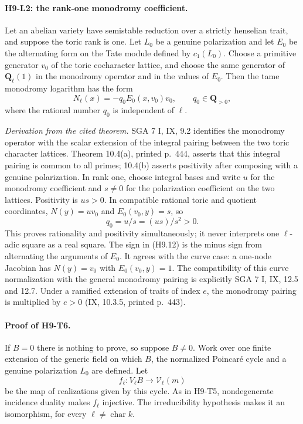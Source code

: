 \documentclass[11pt,a4paper]{article}
\begin{document}
\paragraph{H9-L2: the rank-one monodromy coefficient.}
Let an abelian variety have semistable reduction over a strictly
henselian trait, and suppose the toric rank is one. Let $L_0$ be a
genuine polarization and let $E_0$ be the alternating form on the Tate
module defined by $c_1(L_0)$. Choose a primitive generator $v_0$ of the
toric cocharacter lattice, and choose the same generator of
$\mathbf Q_\ell(1)$ in the monodromy operator and in the values of $E_0$.
Then the tame monodromy logarithm has the form
\[
 N_\ell(x)=-q_0 E_0(x,v_0)v_0,\qquad q_0\in\mathbf Q_{>0},
                                                        \tag{H9.12}
\]
where the rational number $q_0$ is independent of $\ell$.

\emph{Derivation from the cited theorem.} SGA 7 I, IX, 9.2 identifies
the monodromy operator with the scalar extension of the integral
pairing between the two toric character lattices. Theorem 10.4(a),
printed p.~444, asserts that this integral pairing is common to all
primes; 10.4(b) asserts positivity after composing with a genuine
polarization. In rank one, choose integral bases and write $u$ for
the monodromy coefficient and $s\ne0$ for the polarization coefficient
on the two lattices. Positivity is $us>0$. In compatible rational toric
and quotient coordinates, $N(y)=u v_0$ and $E_0(v_0,y)=s$, so
\[
 q_0=u/s=(us)/s^2>0.
\]
This proves rationality and positivity simultaneously; it never interprets
one $\ell$-adic square as a real square. The sign in (H9.12) is the minus
sign from alternating the arguments of $E_0$. It agrees with the curve
case: a one-node Jacobian has $N(y)=v_0$ with
$E_0(v_0,y)=1$. The compatibility of this curve normalization with
the general monodromy pairing is explicitly SGA 7 I, IX, 12.5 and 12.7.
Under a ramified extension of traits of index $e$, the monodromy pairing
is multiplied by $e>0$ (IX, 10.3.5, printed p.~443).

\paragraph{Proof of H9-T6.}
If $B=0$ there is nothing to prove, so suppose $B\ne0$. Work over one
finite extension of the generic field on which $B$, the normalized
Poincar\'e cycle and a genuine polarization $L_0$ are defined. Let
\[
 f_\ell:V_\ell B\longrightarrow\mathcal V_\ell(m)
\]
be the map of realizations given by this cycle. As in H9-T5,
nondegenerate incidence duality makes $f_\ell$ injective. The
irreducibility hypothesis makes it an isomorphism, for every
$\ell\ne\operatorname{char}k$.
\end{document}
